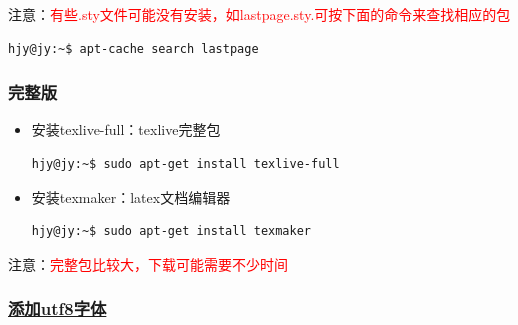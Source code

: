 注意：\textcolor{red}{有些.sty文件可能没有安装，如lastpage.sty.可按下面的命令来查找相应的包}
\begin{lstlisting}[style=BASH]
hjy@jy:~$ apt-cache search lastpage
\end{lstlisting}

\subsubsection{完整版}

\begin{itemize}
\item 安装texlive-full：texlive完整包
\begin{lstlisting}[style=BASH]
hjy@jy:~$ sudo apt-get install texlive-full
\end{lstlisting}
\item 安装texmaker：latex文档编辑器
\begin{lstlisting}[style=BASH]
hjy@jy:~$ sudo apt-get install texmaker
\end{lstlisting}
\end{itemize}
注意：\textcolor{red}{完整包比较大，下载可能需要不少时间}

\subsubsection{\href{http://blog.csdn.net/sdupine/article/details/7958668}{添加utf8字体}}

